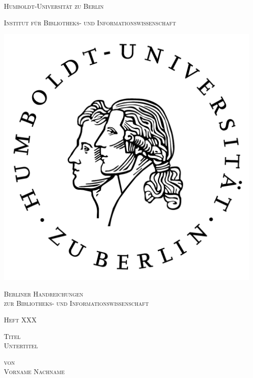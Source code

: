 \documentclass[paper=a4,11pt,twoside,parskip=half-]{scrreprt} %
\begin{document}
\begin{titlepage}
\centering

{\Huge \scshape Humboldt-Universität zu Berlin \par}
{\Large \scshape Institut für Bibliotheks- und Informationswissenschaft \par}

\vspace{2cm}

\includegraphics[scale=.7]{husiegel-sw.png}\\

\vspace{2cm}

{\huge \scshape Berliner Handreichungen \\zur Bibliotheks- und Informationswissenschaft \par}

\vspace{2cm}

{\LARGE \scshape Heft XXX \par} %

\vspace{2,5cm}

{\Large \scshape Titel \\ Untertitel \par}

\vspace{2cm}

{\LARGE \scshape von \\ Vorname Nachname}

\end{titlepage}
\end{document}

